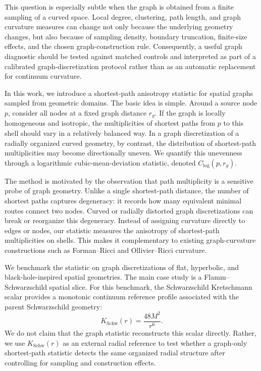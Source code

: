 \documentclass{svproc}
\begin{document}
This question is especially subtle when the graph is obtained from a finite sampling of a curved space. Local degree, clustering, path length, and graph curvature measures can change not only because the underlying geometry changes, but also because of sampling density, boundary truncation, finite-size effects, and the chosen graph-construction rule. Consequently, a useful graph diagnostic should be tested against matched controls and interpreted as part of a calibrated graph-discretization protocol rather than as an automatic replacement for continuum curvature.

In this work, we introduce a shortest-path anisotropy statistic for spatial graphs sampled from geometric domains. The basic idea is simple. Around a source node $p$, consider all nodes at a fixed graph distance $r_g$. If the graph is locally homogeneous and isotropic, the multiplicities of shortest paths from $p$ to this shell should vary in a relatively balanced way. In a graph discretization of a radially organized curved geometry, by contrast, the distribution of shortest-path multiplicities may become directionally uneven. We quantify this unevenness through a logarithmic cubic-mean-deviation statistic, denoted $C_{\log}(p,r_g)$.

The method is motivated by the observation that path multiplicity is a sensitive probe of graph geometry. Unlike a single shortest-path distance, the number of shortest paths captures degeneracy: it records how many equivalent minimal routes connect two nodes. Curved or radially distorted graph discretizations can break or reorganize this degeneracy. Instead of assigning curvature directly to edges or nodes, our statistic measures the anisotropy of shortest-path multiplicities on shells. This makes it complementary to existing graph-curvature constructions such as Forman--Ricci and Ollivier--Ricci curvature.

We benchmark the statistic on graph discretizations of flat, hyperbolic, and black-hole-inspired spatial geometries. The main case study is a Flamm--Schwarzschild spatial slice. For this benchmark, the Schwarzschild Kretschmann scalar provides a monotonic continuum reference profile associated with the parent Schwarzschild geometry:
\begin{equation}
K_{\mathrm{Schw}}(r)=\frac{48M^2}{r^6}.
\end{equation}
We do not claim that the graph statistic reconstructs this scalar directly. Rather, we use $K_{\mathrm{Schw}}(r)$ as an external radial reference to test whether a graph-only shortest-path statistic detects the same organized radial structure after controlling for sampling and construction effects.
\end{document}
